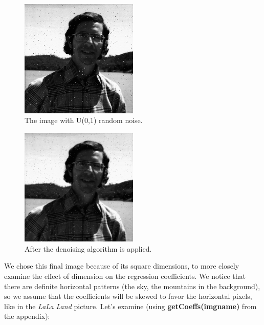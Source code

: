 \documentclass{article}
\begin{document}
\begin{figure}[H]
    \begin{center}
        \includegraphics[width=0.5\textwidth]{noised_matloff.jpg}
    \end{center}
  \caption{The image with U(0,1) random noise.}
\end{figure}

\begin{figure}[H]
    \begin{center}
        \includegraphics[width=0.5\textwidth]{denoised_matloff.jpg}
    \end{center}
  \caption{After the denoising algorithm is applied.}
\end{figure}

We chose this final image because of its square dimensions, to more closely examine the effect of dimension on the regression coefficients.  We notice that there are definite horizontal patterns (the sky, the mountains in the background), so we assume that the coefficients will be skewed to favor the horizontal pixels, like in the \textit{LaLa Land} picture.  Let's examine (using \textbf{getCoeffs(imgname)} from the appendix):
\end{document}
